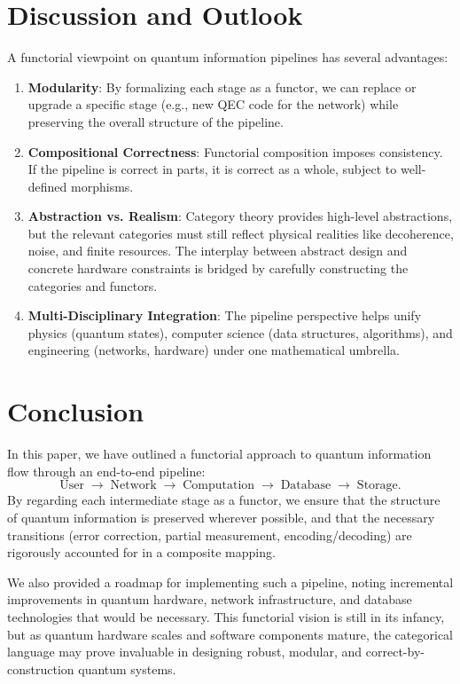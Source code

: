 \documentclass[12pt]{article}
\begin{document}
\section{Discussion and Outlook}

A functorial viewpoint on quantum information pipelines has several advantages:

\begin{enumerate}
\item \textbf{Modularity}: By formalizing each stage as a functor, we can replace or upgrade a specific stage (e.g., new QEC code for the network) while preserving the overall structure of the pipeline.
\item \textbf{Compositional Correctness}: Functorial composition imposes consistency. If the pipeline is correct in parts, it is correct as a whole, subject to well-defined morphisms.
\item \textbf{Abstraction vs. Realism}: Category theory provides high-level abstractions, but the relevant categories must still reflect physical realities like decoherence, noise, and finite resources. The interplay between abstract design and concrete hardware constraints is bridged by carefully constructing the categories and functors.
\item \textbf{Multi-Disciplinary Integration}: The pipeline perspective helps unify physics (quantum states), computer science (data structures, algorithms), and engineering (networks, hardware) under one mathematical umbrella.
\end{enumerate}

\section{Conclusion}

In this paper, we have outlined a functorial approach to quantum information flow through an end-to-end pipeline:
\[
\text{User} \;\longrightarrow\; \text{Network} 
\;\longrightarrow\; \text{Computation} 
\;\longrightarrow\; \text{Database} 
\;\longrightarrow\; \text{Storage}.
\]
By regarding each intermediate stage as a functor, we ensure that the structure of quantum information is preserved wherever possible, and that the necessary transitions (error correction, partial measurement, encoding/decoding) are rigorously accounted for in a composite mapping. 

We also provided a roadmap for implementing such a pipeline, noting incremental improvements in quantum hardware, network infrastructure, and database technologies that would be necessary. This functorial vision is still in its infancy, but as quantum hardware scales and software components mature, the categorical language may prove invaluable in designing robust, modular, and correct-by-construction quantum systems.
\end{document}
